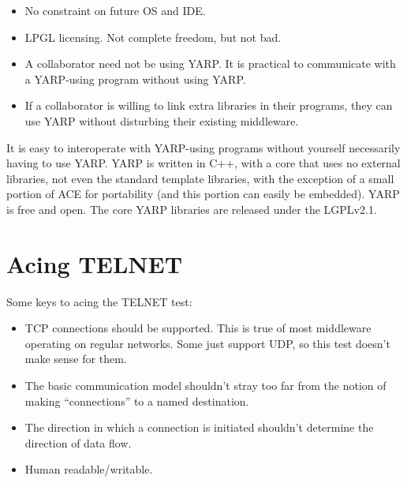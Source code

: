 \documentclass[letterpaper]{article}
\begin{document}
\begin{itemize}

\item No constraint on future OS and IDE.

\item LPGL licensing.  Not complete freedom, but not bad.

\item A collaborator need not be using YARP.  It is practical to
communicate with a YARP-using program without using YARP.

\item If a collaborator is willing to link extra libraries in their
programs, they can use YARP without disturbing their existing
middleware.

\end{itemize}

It is easy to interoperate with YARP-using programs
without yourself necessarily having to use YARP. 
YARP is written in C++, with a core that uses
no external libraries, not even the standard template libraries, with
the exception of a small portion of ACE for portability (and this
portion can easily be embedded). YARP is free and open.  The
core YARP libraries are released under the LGPLv2.1.


\section{Acing TELNET}

Some keys to acing the TELNET test:

\begin{itemize}

\item TCP connections should be supported.  
  This is true of most middleware operating on regular
  networks. Some just support UDP, so this test doesn't
  make sense for them.

\item The basic communication model shouldn't stray too far from the
  notion of making ``connections'' to a named destination.

\item The direction in which a connection is initiated shouldn't
  determine the direction of data flow.

\item Human readable/writable.

\end{itemize}
\end{document}
